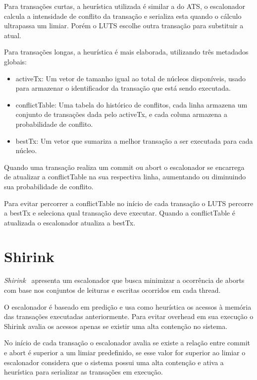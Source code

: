 \documentclass[diss,capa]{texufpel}
\begin{document}
Para transações curtas, a heurística utilizada é similar a do ATS, o escalonador calcula a intensidade de conflito da transação e serializa esta quando o cálculo ultrapassa um limiar. Porém o LUTS escolhe outra transação para substituir a atual.

Para transações longas, a heurística é mais elaborada, utilizando três metadados globais:

\begin{itemize}
 \item  activeTx: Um vetor de tamanho igual ao total de núcleos disponíveis, usado para armazenar o identificador da transação que está sendo executada.
 \item conflictTable: Uma tabela do histórico de conflitos, cada linha armazena um conjunto de transações dada pelo activeTx, e cada coluna armazena a probabilidade de conflito.
 \item bestTx: Um vetor que sumariza a melhor transação a ser executada para cada núcleo.
\end{itemize}

Quando uma transação realiza um commit ou abort o escalonador se encarrega de atualizar a conflictTable na sua respectiva linha, aumentando ou diminuindo sua probabilidade de conflito.

Para evitar percorrer a conflictTable no início de cada transação o LUTS percorre a bestTx e seleciona qual transação deve executar. Quando a conflictTable é atualizada o escalonador atualiza a bestTx.

\section{Shirink}

\emph{Shirink}~\cite{shirink2009} apresenta um escalonador que busca minimizar a ocorrência de aborts com base nos conjuntos de leituras e escritas ocorridos em cada thread.

O escalonador é baseado em predição e usa como heurística os acessos à memória das transações executadas anteriormente. Para evitar overhead em sua execução o Shirink avalia os acessos apenas se existir uma alta contenção no sistema.

No início de cada transação o escalonador avalia se existe a relação entre commit e abort é superior a um limiar predefinido, se esse valor for superior ao limiar o escalonador considera que o sistema possui uma alta contenção e ativa a heurística para serializar as transações em execução.
\end{document}
